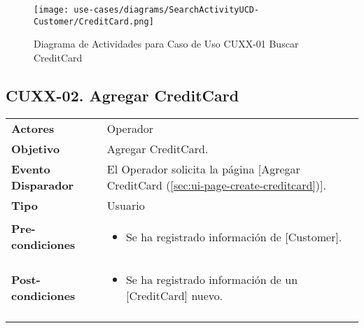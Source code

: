 	\begin{figure}[H]
		\begin{center}
			\label{tab:activity-search-ucd-entity-creditcard}
			\texttt{[image: use-cases/diagrams/SearchActivityUCD-Customer/CreditCard.png]}
			\caption{Diagrama de Actividades para Caso de Uso CUXX-01 Buscar CreditCard}
	\end{center}
	\end{figure}
	\clearpage
	\subsection{CUXX-02. Agregar CreditCard} \label{sec:cu-create-CreditCard}
	
	\begin{tabular}{ p{3.5cm} p{11.5cm} }
		\textbf{Actores} & Operador\\
		\textbf{Objetivo} & Agregar CreditCard.\\
		\textbf{Evento Disparador} & El Operador solicita la p\'agina [Agregar CreditCard (\ref{sec:ui-page-create-creditcard})].\\
		\textbf{Tipo} & Usuario\\
		\textbf{Pre-condiciones} &
			\begin{minipage}[t]{0.6\textwidth}
			\begin{itemize}[noitemsep,nolistsep]
			\setlength{\itemindent}{-.5cm}
				\item Se ha registrado informaci\'on de [Customer].
			\end{itemize}
			\end{minipage} \\
		\textbf{Post-condiciones} &
			\begin{minipage}[t]{0.6\textwidth}
			\begin{itemize}[noitemsep,nolistsep]
			\setlength{\itemindent}{-.5cm}
				\item Se ha registrado informaci\'on de un [CreditCard] nuevo.
			\end{itemize}
			\end{minipage} \\
		\\
	\end{tabular}
	
